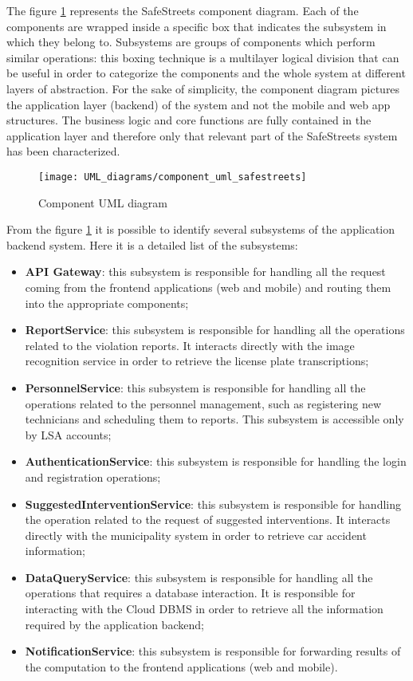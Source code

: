 The figure \ref{fig:component_diagram} represents the SafeStreets component diagram. Each of the components are wrapped inside a specific box that indicates the subsystem in which they belong to.
Subsystems are groups of components which perform similar operations: this boxing technique is a multilayer logical division that can be useful in order to categorize the components and the whole system at different layers of abstraction.
\newline For the sake of simplicity, the component diagram pictures the application layer (backend) of the system and not the mobile and web app structures. The business logic and core functions are fully contained in the application layer and therefore only that relevant part of the SafeStreets system has been characterized.
\begin{figure}[H]
    \centering
    \texttt{[image: UML\_diagrams/component\_uml\_safestreets]}
    \caption{Component UML diagram}
    \label{fig:component_diagram}
\end{figure}
From the figure \ref{fig:component_diagram} it is possible to identify several subsystems of the application backend system. Here it is a detailed list of the subsystems:
\begin{itemize}
    \item \textbf{API Gateway}: this subsystem is responsible for handling all the request coming from the frontend applications (web and mobile) and routing them into the appropriate components;
    \item \textbf{ReportService}: this subsystem is responsible for handling all the operations related to the violation reports. It interacts directly with the image recognition service in order to retrieve the license plate transcriptions;
    \item \textbf{PersonnelService}: this subsystem is responsible for handling all the operations related to the personnel management, such as registering new technicians and scheduling them to reports. This subsystem is accessible only by LSA accounts;
    \item \textbf{AuthenticationService}: this subsystem is responsible for handling the login and registration operations;
    \item \textbf{SuggestedInterventionService}: this subsystem is responsible for handling the operation related to the request of suggested interventions. It interacts directly with the municipality system in order to retrieve car accident information;
    \item \textbf{DataQueryService}: this subsystem is responsible for handling all the operations that requires a database interaction. It is responsible for interacting with the Cloud DBMS in order to retrieve all the information required by the application backend;
    \item \textbf{NotificationService}: this subsystem is responsible for forwarding results of the computation to the frontend applications (web and mobile).
\end{itemize} 
